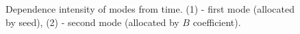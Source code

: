 \begin{figure}
\centering

\caption{
Dependence intensity of modes from time. (1) - first mode (allocated
by seed), (2) - second mode (allocated by $B$ coefficient). 
}
\label{figModes}
\end{figure}